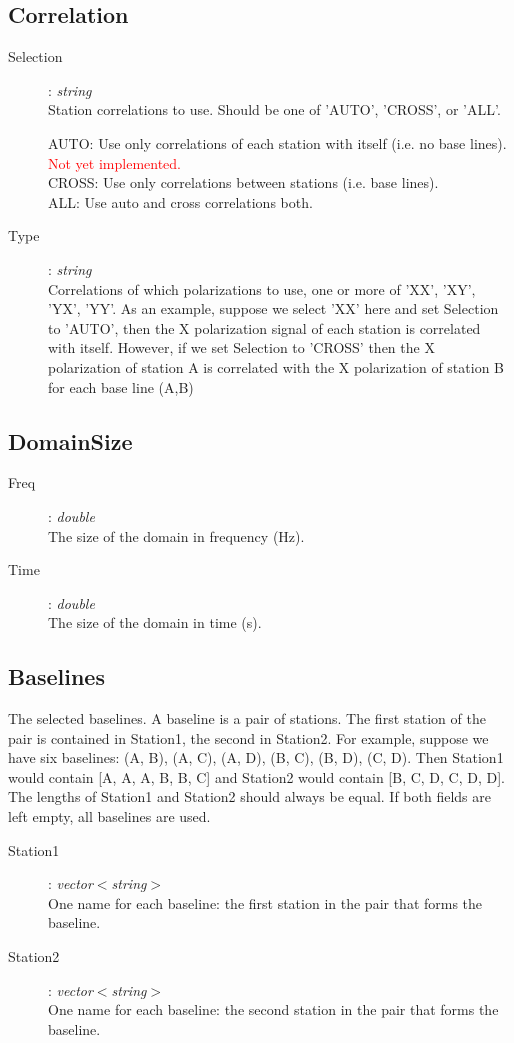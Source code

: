 \documentclass[10pt]{lofar}
\begin{document}
\subsection*{Correlation}
\label{app-correlation}
\begin{description}
\item [Selection] : \emph{string} \\
    Station correlations to use. Should be one of 'AUTO', 'CROSS', or 'ALL'.
\par
        AUTO: Use only correlations of each station with itself (i.e. no base
lines). \textcolor{red}{Not yet implemented.} \\
        CROSS: Use only correlations between stations (i.e. base lines). \\
        ALL: Use auto and cross correlations both.
\item [Type] : \emph{string} \\
    Correlations of which polarizations to use, one or more of 'XX', 'XY', 'YX',
'YY'. As an example, suppose we select 'XX' here and set Selection to 'AUTO',
then the X polarization signal of each station is correlated with itself.
However, if we set Selection to 'CROSS' then the X polarization of station A is
correlated with the X polarization of station B for each base line (A,B)
\end{description}

\subsection*{DomainSize}
\label{app-domainsize}
\begin{description}
\item [Freq] : \emph{double} \\
    The size of the domain in frequency (Hz).
\item [Time] : \emph{double} \\
    The size of the domain in time (s).
\end{description}

\subsection*{Baselines}
\label{app-baselines}
The selected baselines. A baseline is a pair of stations. The first station of
the pair is contained in Station1, the second in Station2. For example, suppose
we have six baselines: (A, B), (A, C), (A, D), (B, C), (B, D), (C, D). Then
Station1 would contain [A, A, A, B, B, C] and Station2 would contain [B, C, D,
C, D, D]. The lengths of Station1 and Station2 should always be equal. If both
fields are left empty, all baselines are used.
\begin{description}
\item [Station1] : \emph{vector$<$string$>$} \\
    One name for each baseline: the first station in the pair that forms the
baseline.
\item [Station2] : \emph{vector$<$string$>$} \\
    One name for each baseline: the second station in the pair that forms the
baseline.
\end{description}
\end{document}
